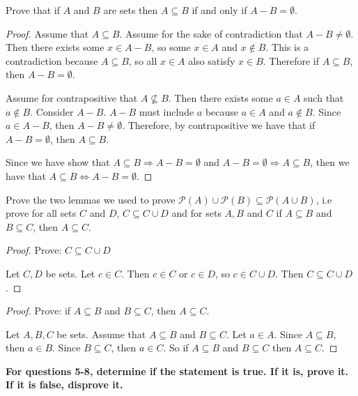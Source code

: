 \documentclass[12 pt]{exam}
\begin{document}
\begin{questions}
\question Prove that if $A$ and $B$ are sets then $A \subseteq B$ if and only if $A - B = \emptyset$.

\begin{solution}\begin{proof}
Assume that $A \subseteq B$. Assume for the sake of
contradiction that $A - B \ne \emptyset$. Then there exists some $x \in A - B$, so some $x \in A$
and $x \notin B$. This is a contradiction because $A \subseteq B$, so all $x \in A$ also satisfy $x \in B$.
Therefore if $A \subseteq B$, then $A - B = \emptyset$.

Assume for contrapositive that $A \nsubseteq B$. Then there exists some $a \in A$ such that $a \notin B$.
Consider $A-B$. $A-B$ must include $a$ because $a \in A$ and $a \notin B$. Since $a \in A-B$, then
$A-B \neq \emptyset$. Therefore, by contrapositive we have that if $A-B = \emptyset$, then $A \subseteq B$.

Since we have show that $A \subseteq B \Rightarrow A-B = \emptyset$ and $A-B = \emptyset \Rightarrow A
\subseteq B$, then we have that $A \subseteq B \iff A-B = \emptyset$.
\end{proof}\end{solution}


\question Prove the two lemmas we used to prove $\mathcal{P}(A) \cup \mathcal{P}(B) \subseteq \mathcal{P}(A \cup B)$, i.e prove for all sets $C$ and $D$, $C \subseteq C \cup D$ and for sets $A, B$ and $C$ if $A \subseteq B$ and $B \subseteq C$, then $A \subseteq C$.

\begin{solution}
\begin{proof}
Prove: $C \subseteq C \cup D$

Let $C, D$ be sets. Let $c \in C$. Then $c \in C$ or $c \in D$, so $c \in C \cup D$.
Then $C \subseteq C \cup D$.
\end{proof}

\begin{proof}
Prove: if $A \subseteq B$ and $B \subseteq C$, then $A \subseteq C$.

Let $A, B, C$ be sets.
Assume that $A \subseteq B$ and $B \subseteq C$. Let $a \in A$. Since $A \subseteq B$, then $a \in B$.
Since $B \subseteq C$, then $a \in C$. So if $A \subseteq B$ and $B \subseteq C$ then $A \subseteq C$.
\end{proof}
\end{solution}

 
\textbf{For questions 5-8, determine if the statement is true.  If it is, prove it.  If it is false, disprove it.}


\end{questions}
\end{document}
